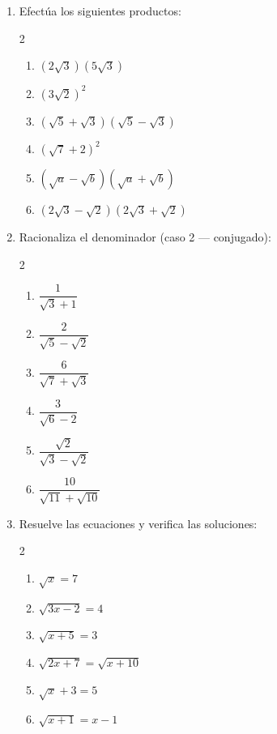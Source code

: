 \documentclass[11pt, letterpaper]{article}
\begin{document}
\begin{enumerate}[label=\textbf{\arabic*.}, leftmargin=*, resume]
  \item Efectúa los siguientes productos:
  \begin{multicols}{2}
  \begin{enumerate}[label=\alph*)]
    \item $(2\sqrt{3})(5\sqrt{3})$
    \item $(3\sqrt{2})^2$
    \item $(\sqrt{5}+\sqrt{3})(\sqrt{5}-\sqrt{3})$
    \item $(\sqrt{7}+2)^2$
    \item $(\sqrt{a}-\sqrt{b})(\sqrt{a}+\sqrt{b})$
    \item $(2\sqrt{3}-\sqrt{2})(2\sqrt{3}+\sqrt{2})$
  \end{enumerate}
  \end{multicols}

  \item Racionaliza el denominador (caso 2 — conjugado):
  \begin{multicols}{2}
  \begin{enumerate}[label=\alph*)]
    \item $\dfrac{1}{\sqrt{3}+1}$
    \item $\dfrac{2}{\sqrt{5}-\sqrt{2}}$
    \item $\dfrac{6}{\sqrt{7}+\sqrt{3}}$
    \item $\dfrac{3}{\sqrt{6}-2}$
    \item $\dfrac{\sqrt{2}}{\sqrt{3}-\sqrt{2}}$
    \item $\dfrac{10}{\sqrt{11}+\sqrt{10}}$
  \end{enumerate}
  \end{multicols}

  \item Resuelve las ecuaciones y verifica las soluciones:
  \begin{multicols}{2}
  \begin{enumerate}[label=\alph*)]
    \item $\sqrt{x} = 7$
    \item $\sqrt{3x-2} = 4$
    \item $\sqrt{x+5} = 3$
    \item $\sqrt{2x+7} = \sqrt{x+10}$
    \item $\sqrt{x}+3=5$
    \item $\sqrt{x+1}=x-1$
  \end{enumerate}
  \end{multicols}
\end{enumerate}
\end{document}
